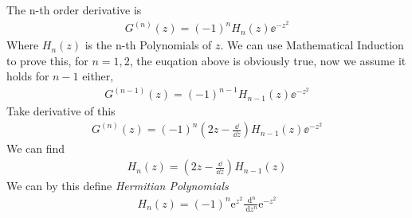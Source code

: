 The n-th order derivative is 
\begin{eqnarray}
    G^{(n)} (z) = (-1)^n H_n(z) \ee^{-z^2}
\end{eqnarray}
Where $H_n(z)$ is the n-th Polynomials of $z$. We can use Mathematical Induction to prove this, for $n=1,2$, the euqation above is obviously true, now we assume it holds for $n-1$ either, 
\begin{eqnarray}
    G^{(n-1)}(z) = (-1)^{n-1} H_{n-1} (z) \ee^{-z^2} 
\end{eqnarray}
Take derivative of this 
\begin{eqnarray}
    G^{(n)}(z) = (-1)^n \left(2z- \frac{\dd}{\dd z}\right) H_{n-1}(z) \ee^{-z^2}
\end{eqnarray}
We can find
\begin{eqnarray}
    H_n(z) = \left(2z-\frac{\dd}{\dd z}\right) H_{n-1}(z)
\end{eqnarray}
We can by this define \emph{Hermitian Polynomials}
\begin{eqnarray}
    H_n(z)=(-1)^n \mathrm{e}^{z^2} \frac{\mathrm{~d}^n}{\mathrm{~d} z^n} \mathrm{e}^{-z^2}
\end{eqnarray}

\newpage

































































































